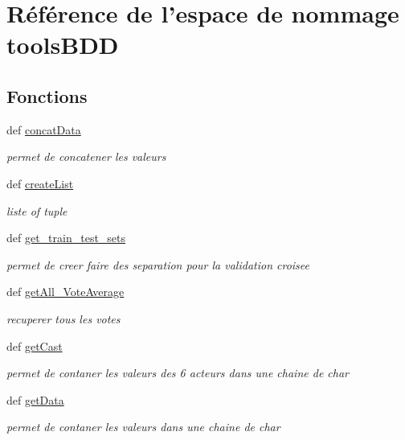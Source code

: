 \hypertarget{namespacetoolsBDD}{\section{Référence de l'espace de nommage tools\-B\-D\-D}
\label{namespacetoolsBDD}
}
\subsection*{Fonctions}
\begin{DoxyCompactItemize}
\item 
def \hyperlink{namespacetoolsBDD_abf21310dd3cdd39ff5f781eaafb23b24}{concat\-Data}
\begin{DoxyCompactList}\small\item\em permet de concatener les valeurs \end{DoxyCompactList}\item 
def \hyperlink{namespacetoolsBDD_afc4367a1a711e612f8f4d6363edbc640}{create\-List}
\begin{DoxyCompactList}\small\item\em liste of tuple \end{DoxyCompactList}\item 
def \hyperlink{namespacetoolsBDD_a60efb6c205d51bf9a9e32b6d19f633b4}{get\-\_\-train\-\_\-test\-\_\-sets}
\begin{DoxyCompactList}\small\item\em permet de creer faire des separation pour la validation croisee \end{DoxyCompactList}\item 
def \hyperlink{namespacetoolsBDD_ae897b96e0c4a89d09f418e620819a066}{get\-All\-\_\-\-Vote\-Average}
\begin{DoxyCompactList}\small\item\em recuperer tous les votes \end{DoxyCompactList}\item 
def \hyperlink{namespacetoolsBDD_a15b2ef52eec23442bb79863d794e2e2b}{get\-Cast}
\begin{DoxyCompactList}\small\item\em permet de contaner les valeurs des 6 acteurs dans une chaine de char \end{DoxyCompactList}\item 
def \hyperlink{namespacetoolsBDD_ab6a097315bef68f12966b652fd120913}{get\-Data}
\begin{DoxyCompactList}\small\item\em permet de contaner les valeurs dans une chaine de char \end{DoxyCompactList}\item 

\end{DoxyCompactItemize}
